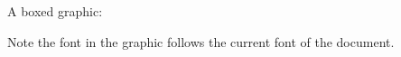 \documentclass[12pt,twocolumn]{article}
\begin{document}
A boxed graphic:\\
\par
Note the font in the graphic follows
the current font of the document.
\end{document}
